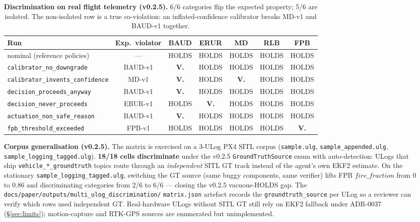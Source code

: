 \documentclass[11pt,a4paper]{article}
\begin{document}
\begin{table}[h]
\centering\small
\begin{tabular}{l c c c c c c}
\toprule
\textbf{Run} & \textbf{Exp.\ violator} & BAUD & ERUR & MD & RLB & FPB \\
\midrule
nominal (reference policies)              & ---     & HOLDS & HOLDS & HOLDS & HOLDS & HOLDS \\
\texttt{calibrator\_no\_downgrade}        & BAUD-v1 & \textbf{V.} & HOLDS & HOLDS & HOLDS & HOLDS \\
\texttt{calibrator\_invents\_confidence}  & MD-v1   & \textbf{V.} & HOLDS & \textbf{V.} & HOLDS & HOLDS \\
\texttt{decision\_proceeds\_anyway}       & BAUD-v1 & \textbf{V.} & HOLDS & HOLDS & HOLDS & HOLDS \\
\texttt{decision\_never\_proceeds}        & ERUR-v1 & HOLDS & \textbf{V.} & HOLDS & HOLDS & HOLDS \\
\texttt{actuation\_non\_safe\_reason}     & BAUD-v1 & \textbf{V.} & HOLDS & HOLDS & HOLDS & HOLDS \\
\texttt{fpb\_threshold\_exceeded}         & FPB-v1  & HOLDS & HOLDS & HOLDS & HOLDS & \textbf{V.} \\
\bottomrule
\end{tabular}
\caption{\textbf{Discrimination on real flight telemetry
(v0.2.5).} 6/6 categories flip the expected property; 5/6 are
isolated. The non-isolated row is a true co-violation: an
inflated-confidence calibrator breaks MD-v1 and BAUD-v1 together.}
\label{tab:real-verdict}
\end{table}

\textbf{Corpus generalisation (v0.2.5).} The matrix is exercised
on a 3-ULog PX4 SITL corpus (\texttt{sample.ulg},
\texttt{sample\_appended.ulg}, \texttt{sample\_logging\_tagged.ulg}).
\textbf{18/18 cells discriminate} under the v0.2.5
\texttt{GroundTruthSource} enum with auto-detection: ULogs that
ship \texttt{vehicle\_*\_groundtruth} topics route through an
\emph{independent} SITL GT track instead of the agent's own EKF2
estimate. On the stationary
\texttt{sample\_logging\_tagged.ulg}, switching the GT source
(same buggy components, same verifier) lifts FPB
$\mathit{fire\_fraction}$ from 0 to 0.86 and discriminating
categories from 2/6 to 6/6 --- closing the v0.2.5 vacuous-HOLDS
gap. The
\texttt{docs/paper/outputs/multi\_ulog\_discrimination/}
\texttt{matrix.json} artefact records the
\texttt{groundtruth\_source} per ULog so a reviewer can verify
which rows used independent GT. Real-hardware ULogs without
SITL GT still rely on EKF2 fallback under ADR-0037
(\S\ref{sec:limits}); motion-capture and RTK-GPS sources are
enumerated but unimplemented.
\end{document}

